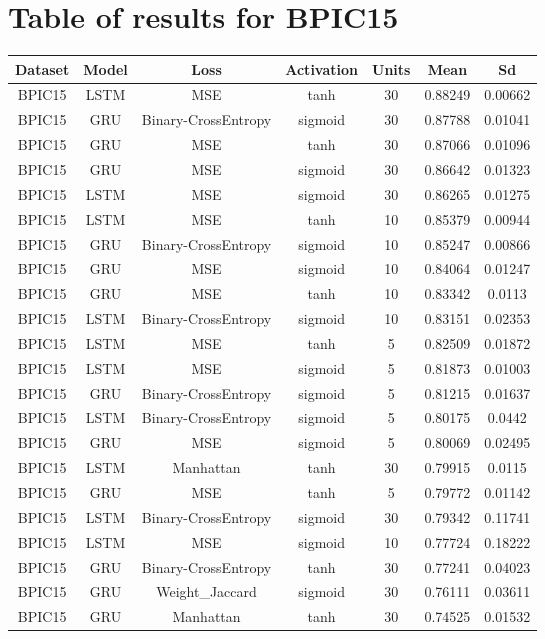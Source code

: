 \documentclass{article}%
\begin{document}
%
\normalsize%
\section{Table of results for BPIC15}%
\label{sec:TableofresultsforBPIC15}%
\begin{longtable}{|c|c|c|c|c|c|c|}%
\hline%
\rowcolor{lightgray!70}%
\textbf{Dataset}&\textbf{Model}&\textbf{Loss}&\textbf{Activation}&\textbf{Units}&\textbf{Mean}&\textbf{Sd}\\%
\hline%
BPIC15&LSTM&MSE&tanh&30&0.88249&0.00662\\%
\hline%
BPIC15&GRU&Binary{-}CrossEntropy&sigmoid&30&0.87788&0.01041\\%
\hline%
BPIC15&GRU&MSE&tanh&30&0.87066&0.01096\\%
\hline%
BPIC15&GRU&MSE&sigmoid&30&0.86642&0.01323\\%
\hline%
BPIC15&LSTM&MSE&sigmoid&30&0.86265&0.01275\\%
\hline%
BPIC15&LSTM&MSE&tanh&10&0.85379&0.00944\\%
\hline%
BPIC15&GRU&Binary{-}CrossEntropy&sigmoid&10&0.85247&0.00866\\%
\hline%
BPIC15&GRU&MSE&sigmoid&10&0.84064&0.01247\\%
\hline%
BPIC15&GRU&MSE&tanh&10&0.83342&0.0113\\%
\hline%
BPIC15&LSTM&Binary{-}CrossEntropy&sigmoid&10&0.83151&0.02353\\%
\hline%
BPIC15&LSTM&MSE&tanh&5&0.82509&0.01872\\%
\hline%
BPIC15&LSTM&MSE&sigmoid&5&0.81873&0.01003\\%
\hline%
BPIC15&GRU&Binary{-}CrossEntropy&sigmoid&5&0.81215&0.01637\\%
\hline%
BPIC15&LSTM&Binary{-}CrossEntropy&sigmoid&5&0.80175&0.0442\\%
\hline%
BPIC15&GRU&MSE&sigmoid&5&0.80069&0.02495\\%
\hline%
BPIC15&LSTM&Manhattan&tanh&30&0.79915&0.0115\\%
\hline%
BPIC15&GRU&MSE&tanh&5&0.79772&0.01142\\%
\hline%
BPIC15&LSTM&Binary{-}CrossEntropy&sigmoid&30&0.79342&0.11741\\%
\hline%
BPIC15&LSTM&MSE&sigmoid&10&0.77724&0.18222\\%
\hline%
BPIC15&GRU&Binary{-}CrossEntropy&tanh&30&0.77241&0.04023\\%
\hline%
BPIC15&GRU&Weight\_Jaccard&sigmoid&30&0.76111&0.03611\\%
\hline%
BPIC15&GRU&Manhattan&tanh&30&0.74525&0.01532\\%

\end{longtable}
\end{document}
